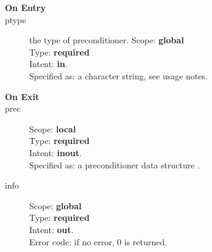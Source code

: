 \begin{description}
\item[\bf On Entry]
\item[ptype] the type of preconditioner. 
Scope: {\bf global} \\
Type: {\bf required}\\
Intent: {\bf in}.\\
Specified as: a character string, see usage notes.
\item[\bf On Exit]

\item[prec] 
Scope: {\bf local} \\
Type: {\bf required}\\
Intent: {\bf inout}.\\
Specified as: a preconditioner data structure \precdata.
\item[info] 
Scope: {\bf global} \\
Type: {\bf required}\\
Intent: {\bf out}.\\
Error code: if no error, 0 is returned.
\end{description}
